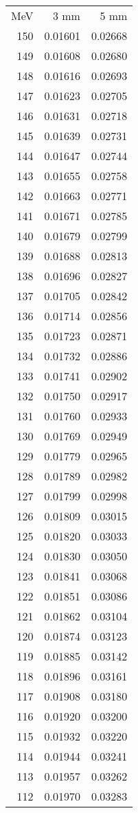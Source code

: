 \documentclass[11pt]{article}
\begin{document}
\begin{minipage}[l]{.3\linewidth}
\begin{tabular}{r|rr}
MeV&3 mm&5 mm\\
150&0.01601&0.02668\\
149&0.01608&0.02680\\ 
148&0.01616&0.02693\\ 
147&0.01623&0.02705\\ 
146&0.01631&0.02718\\ 
145&0.01639&0.02731\\ 
144&0.01647&0.02744\\ 
143&0.01655&0.02758\\ 
142&0.01663&0.02771\\ 
141&0.01671&0.02785\\ 
140&0.01679&0.02799\\ 
139&0.01688&0.02813\\ 
138&0.01696&0.02827\\ 
137&0.01705&0.02842\\ 
136&0.01714&0.02856\\ 
135&0.01723&0.02871\\ 
134&0.01732&0.02886\\ 
133&0.01741&0.02902\\ 
132&0.01750&0.02917\\ 
131&0.01760&0.02933\\ 
130&0.01769&0.02949\\ 
129&0.01779&0.02965\\ 
128&0.01789&0.02982\\ 
127&0.01799&0.02998\\ 
126&0.01809&0.03015\\ 
125&0.01820&0.03033\\ 
124&0.01830&0.03050\\ 
123&0.01841&0.03068\\ 
122&0.01851&0.03086\\ 
121&0.01862&0.03104\\ 
120&0.01874&0.03123\\ 
119&0.01885&0.03142\\ 
118&0.01896&0.03161\\ 
117&0.01908&0.03180\\ 
116&0.01920&0.03200\\ 
115&0.01932&0.03220\\ 
114&0.01944&0.03241\\ 
113&0.01957&0.03262\\ 
112&0.01970&0.03283\\ 

\end{tabular}
\end{minipage}
\end{document}
